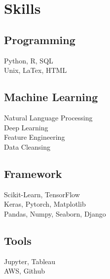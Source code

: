 \documentclass[letterpaper]{deedy-resume} %
\begin{document}
\begin{minipage}[t]{0.33\textwidth} %


\section{Skills}

\subsection{Programming}
Python, R, SQL \\
Unix, LaTex, HTML \\

\sectionspace %

\subsection{Machine Learning}
Natural Language Processing \\
Deep Learning \\
Feature Engineering \\
Data Cleansing \\

\sectionspace %

\subsection{Framework}
Scikit-Learn, TensorFlow \\
Keras, Pytorch, Matplotlib \\
Pandas, Numpy, Seaborn, Django \\

\sectionspace %

\subsection{Tools}
Jupyter, Tableau \\
AWS, Github \\



\end{minipage}
\end{document}
